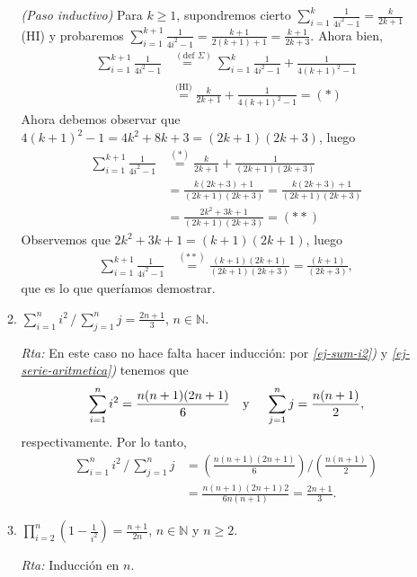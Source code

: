 \documentclass[12pt,spanish,makeidx]{amsbook}
\newcommand{\rta}{\noindent\textit{Rta: }}
\begin{document}
\begin{enumerate}
\begin{enumerate}
			\textit{(Paso inductivo) }  Para  $k \ge 1$,  supondremos cierto $\sum_{i=1}^k \frac{1}{4i^2-1} = \frac{k}{2k+1}$ (HI) y probaremos $\sum_{i=1}^{k+1} \frac{1}{4i^2-1} = \frac{k+1}{2(k+1)+1} = \frac{k+1}{2k+3}$. Ahora bien,
			\begin{align*}
			\sum_{i=1}^{k+1} \frac{1}{4i^2-1} &\overset{(\text{def } \Sigma)}{=\quad}\sum_{i=1}^{k} \frac{1}{4i^2-1} +  \frac{1}{4(k+1)^2-1}\\
			&\overset{\text{(HI)}}{=} \frac{k}{2k+1} + \frac{1}{4(k+1)^2-1} = (*)
			\end{align*}
			Ahora debemos observar que $4(k+1)^2-1 = 4k^2 +8k+3 = (2k+1)(2k+3)$, luego
			\begin{align*}
			\sum_{i=1}^{k+1} \frac{1}{4i^2-1} &\overset{(*)}{=} \frac{k}{2k+1} + \frac{1}{(2k+1)(2k+3)} \\
			&=  \frac{k(2k+3) +1}{(2k+1)(2k+3)} = \frac{k(2k+3) +1}{(2k+1)(2k+3)} \\
			&=  \frac{2k^2+3k +1}{(2k+1)(2k+3)}  = (**)
			\end{align*}
			Observemos  que $2k^2+3k +1 = (k+1)(2k+1)$, luego
			\begin{align*}
			\sum_{i=1}^{k+1} \frac{1}{4i^2-1} &\overset{(**)}{=} \frac{(k+1)(2k+1)}{(2k+1)(2k+3)} = \frac{(k+1)}{(2k+3)},
			\end{align*}
			que es lo que queríamos demostrar.
			
			\item $\displaystyle{ \sum_{i=1}^n i^2\, /\, \sum_{j=1}^n j = \frac{2n+1}{3}}$, $n\in \mathbb N$.
			
			\rta En  este caso no hace falta hacer inducción: por \textit{ \ref{ej-sum-i2})} y \textit{\ref{ej-serie-aritmetica})} tenemos que 
			\begin{equation*}
				\sum_{i=1}^n i^2 = \frac{n(n+1)(2n+1)}{6} \text{\quad y \quad} \sum_{j=1}^n j = \frac{n(n+1)}{2},
			\end{equation*}
			respectivamente. Por  lo tanto, 
			\begin{align*}
				\sum_{i=1}^n i^2\, /\, \sum_{j=1}^n j &= \left(\frac{n(n+1)(2n+1)}{6}\right) / \left(\frac{n(n+1)}{2}\right) \\
				&= \frac{n(n+1)(2n+1)2}{6n(n+1)} = \frac{2n+1}{3}.
			\end{align*}
			
			
			\item $\displaystyle{ \prod_{i=2}^n \left(1-\frac{1}{i^2}\right) = \frac{n+1}{2n}}$, $n\in \mathbb N$ y $ n\ge 2$.
			
			\rta Inducción en $n$.
			

\end{enumerate}
\end{enumerate}
\end{document}
